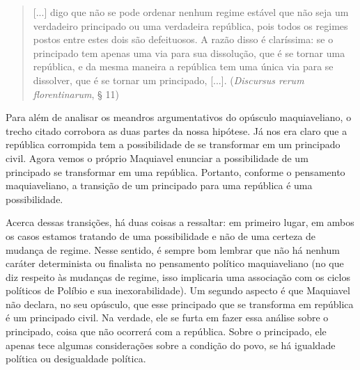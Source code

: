 \begin{quote}
{[}...{]} digo que não se pode ordenar nenhum regime estável que não
seja um verdadeiro principado ou uma verdadeira república, pois todos os
regimes postos entre estes dois são defeituosos. A razão disso é
claríssima: se o principado tem apenas uma via para sua dissolução, que
é se tornar uma república, e da mesma maneira a república tem uma única
via para se dissolver, que é se tornar um principado, {[}...{]}.
(\emph{Discursus rerum florentinarum}, § 11)
\end{quote}

Para além de analisar os meandros argumentativos do opúsculo
maquiaveliano, o trecho citado corrobora as duas partes da nossa
hipótese. Já nos era claro que a república corrompida tem a
possibilidade de se transformar em um principado civil. Agora vemos o
próprio Maquiavel enunciar a possibilidade de um principado se
transformar em uma república. Portanto, conforme o pensamento
maquiaveliano, a transição de um principado para uma república é uma
possibilidade.

Acerca dessas transições, há duas coisas a ressaltar: em primeiro lugar,
em ambos os casos estamos tratando de uma possibilidade e não de uma
certeza de mudança de regime. Nesse sentido, é sempre bom lembrar que
não há nenhum caráter determinista ou finalista no pensamento político
maquiaveliano (no que diz respeito às mudanças de regime, isso
implicaria uma associação com os ciclos políticos de Políbio e sua
inexorabilidade). Um segundo aspecto é que Maquiavel não declara, no seu
opúsculo, que esse principado que se transforma em república é um
principado civil. Na verdade, ele se furta em fazer essa análise sobre o
principado, coisa que não ocorrerá com a república. Sobre o principado,
ele apenas tece algumas considerações sobre a condição do povo, se há
igualdade política ou desigualdade política.

